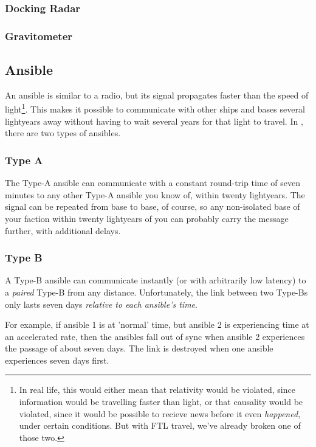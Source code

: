 \subsubsection{Docking Radar}

\subsubsection{Gravitometer}

\subsection{Ansible}
\par
An ansible is similar to a radio, but its signal propagates faster than the speed of light\footnote{In real life, this would either mean that relativity would be violated, since information would be travelling faster than light, or that causality would be violated, since it would be possible to recieve news before it even \textit{happened}, under certain conditions. But with FTL travel, we've already broken one of those two.}. This makes it possible to communicate with other ships and bases several lightyears away without having to wait several years for that light to travel. In \getTitle, there are two types of ansibles.

\subsubsection{Type A}
\par
The Type-A ansible can communicate with a constant round-trip time of seven minutes to any other Type-A ansible you know of, within twenty lightyears. The signal can be repeated from base to base, of course, so any non-isolated base of your faction within twenty lightyears of you can probably carry the message further, with additional delays.

\subsubsection{Type B}
\par
A Type-B ansible can communicate instantly (or with arbitrarily low latency) to a \textit{paired} Type-B from any distance. Unfortunately, the link between two Type-Bs only lasts seven days \textit{relative to each ansible's time}.

\par
For example, if ansible 1 is at 'normal' time, but ansible 2 is experiencing time at an accelerated rate, then the ansibles fall out of sync when ansible 2 experiences the passage of about seven days. The link is destroyed when one ansible experiences seven days first.


